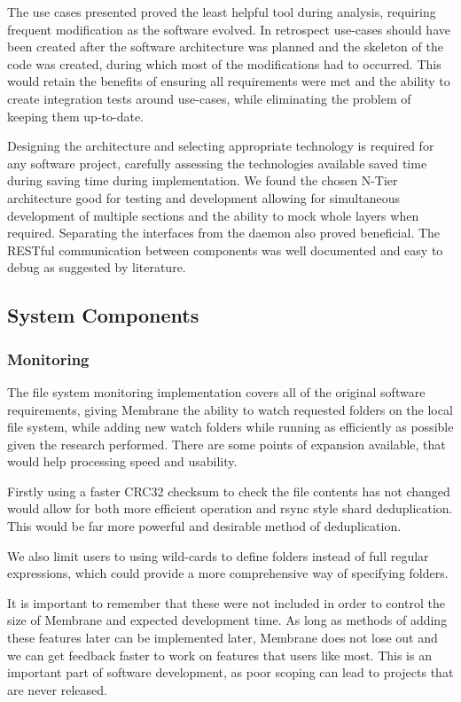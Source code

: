 \documentclass[11pt, a4paper, twoside]{report}
\begin{document}
The use cases presented proved the least helpful tool during analysis, requiring frequent modification as the software evolved. In retrospect use-cases should have been created after the software architecture was planned and the skeleton of the code was created, during which most of the modifications had to occurred. This would retain the benefits of ensuring all requirements were met and the ability to create integration tests around use-cases, while eliminating the problem of keeping them up-to-date.

Designing the architecture and selecting appropriate technology is required for any software project, carefully assessing the technologies available saved time during  saving time during implementation. We found the chosen N-Tier architecture good for testing and development allowing for simultaneous development of multiple sections and the ability to mock whole layers when required. Separating the interfaces from the daemon also proved beneficial. The RESTful communication between components was well documented and easy to debug as suggested by literature.

\subsection{System Components}

\subsubsection{Monitoring}

The file system monitoring implementation covers all of the original software requirements, giving Membrane the ability to watch requested folders on the local file system, while adding new watch folders while running as efficiently as possible given the research performed. There are some points of expansion available, that would help processing speed and usability.

Firstly using a faster CRC32 checksum to check the file contents has not changed would allow for both more efficient operation and rsync style shard deduplication. This would be far more powerful and desirable method of deduplication.

We also limit users to using wild-cards to define folders instead of full regular expressions, which could provide a more comprehensive way of specifying folders.

It is important to remember that these were not included in order to control the size of Membrane and expected development time. As long as methods of adding these features later can be implemented later, Membrane does not lose out and we can get feedback faster to work on features that users like most. This is an important part of software development, as poor scoping can lead to projects that are never released.
\end{document}
